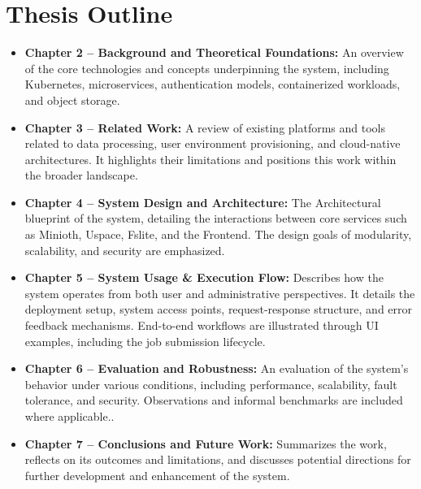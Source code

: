 \section{Thesis Outline}
\begin{itemize}
    \item \textbf{Chapter 2 – Background and Theoretical Foundations:}  
    An overview of the core technologies and concepts underpinning the system, including Kubernetes, microservices, authentication models, 
    containerized workloads, and object storage.

    \item \textbf{Chapter 3 – Related Work:}  
    A review of existing platforms and tools related to data processing, user environment provisioning, and cloud-native architectures. 
    It highlights their limitations and positions this work within the broader landscape.

    \item \textbf{Chapter 4 – System Design and Architecture:}  
    The Architectural blueprint of the system, detailing the interactions between core services such as Minioth, Uspace, Fslite, and the Frontend. 
    The design goals of modularity, scalability, and security are emphasized.

    \item \textbf{Chapter 5 – System Usage \& Execution Flow:}  
    Describes how the system operates from both user and administrative perspectives. It details the deployment setup, system access points, 
    request-response structure, and error feedback mechanisms.  
    End-to-end workflows are illustrated through UI examples, including the job submission lifecycle.  

    \item \textbf{Chapter 6 – Evaluation and Robustness:}  
    An evaluation of the system’s behavior under various conditions, including performance, scalability, fault tolerance, and security. 
    Observations and informal benchmarks are included where applicable..

    \item \textbf{Chapter 7 – Conclusions and Future Work:}  
    Summarizes the work, reflects on its outcomes and limitations, and discusses potential directions for further development 
    and enhancement of the system.
\end{itemize}

